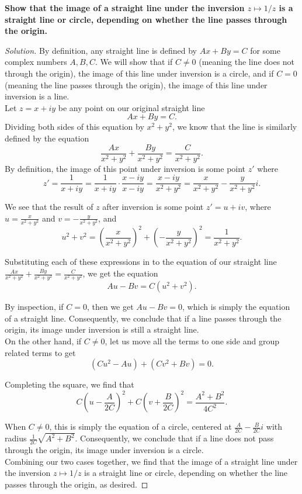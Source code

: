 \documentclass[11pt]{article}
\newenvironment{solution}
  {\renewcommand\qedsymbol{$\blacksquare$}\begin{proof}[Solution]}
  {\end{proof}}
\theoremstyle{definition}
\begin{document}
\textbf{Show that the image of a straight line under the inversion $z \mapsto 1/z$ is a straight line or circle, depending on whether the line passes through the origin.} \\

\begin{solution}
By definition, any straight line is defined by $Ax + By = C$ for some complex numbers $A, B, C$. We will show that if $C \neq 0$ (meaning the line does not through the origin), the image of this line under inversion is a circle, and if $C = 0$ (meaning the line passes through the origin), the image of this line under inversion is a line. \\

Let $z = x + iy$ be any point on our original straight line \[Ax + By = C.\] Dividing both sides of this equation by $x^2+y^2$, we know that the line is similarly defined by the equation
\[ \frac{Ax}{x^2+y^2} + \frac{By}{x^2+y^2} = \frac{C}{x^2+y^2}. \]
By definition, the image of this point under inversion is some point $z'$ where
\[ z' = \frac{1}{x+iy} = \frac{1}{x+iy} \cdot \frac{x-iy}{x-iy} = \frac{x-iy}{x^2+y^2} = \frac{x}{x^2+y^2} - \frac{y}{x^2+y^2}i. \] 


We see that the result of $z$ after inversion is some point $z' = u + iv$, where $u = \frac{x}{x^2+y^2}$ and $v = -\frac{y}{x^2+y^2}$, and \[u^2 + v^2 = \left( \frac{x}{x^2+y^2} \right)^2 + \left(-\frac{y}{x^2+y^2} \right)^2 = \frac{1}{x^2+y^2}. \]

Substituting each of these expressions in to the equation of our straight line $\frac{Ax}{x^2+y^2} + \frac{By}{x^2+y^2} = \frac{C}{x^2+y^2}$, we get the equation
\[ Au - Bv = C(u^2+v^2).\]

By inspection, if $C=0$, then we get $Au - Bv = 0$, which is simply the equation of a straight line. Consequently, we conclude that if a line passes through the origin, its image under inversion is still a straight line. \\

On the other hand, if $C \neq 0$, let us move all the terms to one side and group related terms to get
\[ (Cu^2 - Au) + (Cv^2 + Bv) = 0.\]

Completing the square, we find that
\[ C\left(u - \frac{A}{2C}\right)^2 + C\left(v + \frac{B}{2C}\right)^2 = \frac{A^2 + B^2}{4C^2}.\]

When $C \neq 0$, this is simply the equation of a circle, centered at $\frac{A}{2C} - \frac{B}{2C} i$ with radius $\frac{1}{2C}\sqrt{A^2 +B^2}.$ Consequently, we conclude that if a line does not pass through the origin, its image under inversion is a circle. \\

Combining our two cases together, we find that the image of a straight line under the inversion $z \mapsto 1/z$ is a straight line or circle, depending on whether the line passes through the origin, as desired.
\end{solution}
\end{document}
